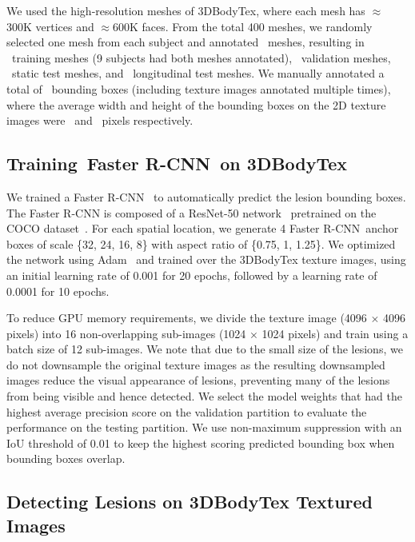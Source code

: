 \documentclass[journal]{IEEEtran}
\def\fasterrcnn{Faster R-CNN}
\begin{document}
We used the high-resolution meshes of 3DBodyTex, where each mesh has $\approx$300K vertices and $\approx$600K faces. From the total 400 meshes, we randomly selected one mesh from each subject and annotated \numberBodyTexScansAnnotated~meshes, resulting in \numberBodyTexTrainScans~training meshes (9 subjects had both meshes annotated), \numberBodyTexValidSubjects~validation meshes, \numberBodyTexTestSubjects~static test meshes, and \numberBodyTexLongScans~longitudinal test meshes. We manually annotated a total of \numberBodyTexLesionsAnnotated~bounding boxes (including texture images annotated multiple times), where the average width and height of the bounding boxes on the 2D texture images were \annotatedBodyTexAvgWidth~and \annotatedBodyTexAvgHeight~pixels respectively.  


\subsection{Training~\fasterrcnn~on 3DBodyTex}
\label{skin3d:sec:rcnn}

We trained a \fasterrcnn~\citep{Ren2016} to automatically predict the lesion bounding boxes. The Faster R-CNN is composed of a ResNet-50 network~\citep{he2016deep} pretrained on the COCO dataset~\citep{lin2014microsoft}. For each spatial location, we generate 4 \fasterrcnn~anchor boxes of scale \{32, 24, 16, 8\} with aspect ratio of \{0.75, 1, 1.25\}. We optimized the network using Adam~\citep{Kingma2015} and trained over the 3DBodyTex texture images, using an initial learning rate of 0.001 for 20 epochs, followed by a learning rate of 0.0001 for 10 epochs. 

To reduce GPU memory requirements, we divide the texture image (4096 $\times$ 4096 pixels) into 16 non-overlapping sub-images (1024 $\times$ 1024 pixels) and train using a batch size of 12 sub-images. We note that due to the small size of the lesions, we do not downsample the original texture images as the resulting downsampled images reduce the visual appearance of lesions, preventing many of the lesions from being visible and hence detected. We select the model weights that had the highest average precision score on the validation partition to evaluate the performance on the testing partition. We use non-maximum suppression with an IoU threshold of 0.01 to keep the highest scoring predicted bounding box when bounding boxes overlap.


\subsection{Detecting Lesions on 3DBodyTex Textured Images}
\label{skin3d:sec:3dbodytex-static}
\end{document}
